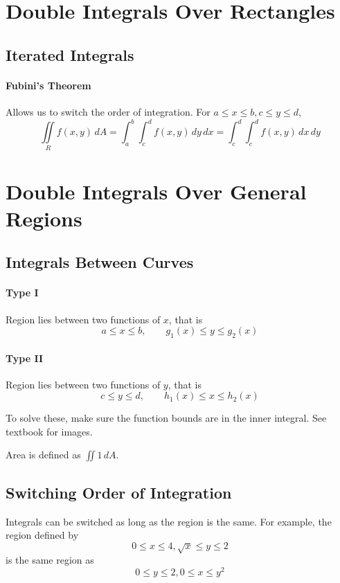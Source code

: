 \documentclass{report}  %
\begin{document}
\setcounter{chapter}{15}
\section{Double Integrals Over Rectangles}
\subsection*{Iterated Integrals}
\paragraph{Fubini's Theorem} 
Allows us to switch the order of integration. For $a \le x \le b, c \le y \le d$,
\begin{equation}
	\iint \limits_R f(x,y) \, dA = 
	\int_a^b \int_c^d f(x,y) \, dy \, dx =
	\int_c^d \int_c^d f(x,y) \, dx \, dy
\end{equation}

\section{Double Integrals Over General Regions}
\subsection*{Integrals Between Curves}
\paragraph{Type I} Region lies between two functions of $x$, that is 
$$a \le x \le b, \qquad g_1(x) \le y \le g_2(x)$$

\paragraph{Type II} Region lies between two functions of $y$, that is 
$$c \le y \le d, \qquad h_1(x) \le x \le h_2(x)$$

To solve these, make sure the function bounds are in the inner integral. 
See textbook for images.

Area is defined as $\iint 1 \, dA$.

\subsection*{Switching Order of Integration}
Integrals can be switched as long as the region is the same. 
For example, the region defined by $$0 \le x \le 4, \sqrt{x} \le y \le 2$$ is the same region as $$0 \le y \le 2, 0 \le x \le y^2$$
\end{document}
